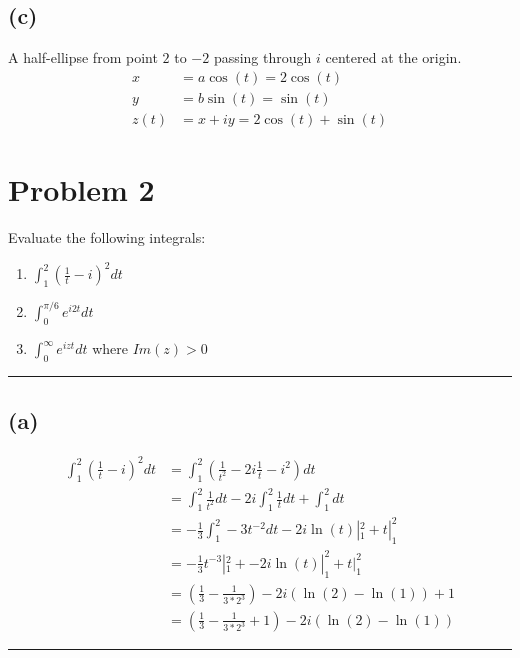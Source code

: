 \documentclass{article}
\let\oldcos\cos
\let\oldsin\sin
\renewcommand{\cos}[1]{\oldcos\left(#1\right)}
\renewcommand{\sin}[1]{\oldsin\left(#1\right)}
\begin{document}
\subsection*{(c)}
A half-ellipse from point $2$ to $-2$ passing through $i$ centered at the origin.
\begin{align*}
   x & = a \cos{t} = 2\cos{t}\\
  y & = b \sin{t} = \sin{t}\\
  z(t) &= x + iy = 2\cos{t} + \sin{t}
\end{align*}
\begin{center}
\end{center}


\newpage
\section*{Problem 2}
Evaluate the following integrals: 
\begin{enumerate}
\item  $\int_1^2 (\frac{1}{t}-i)^2 dt $
\item $\int_0^{\pi/6} e^{i2t}dt$
\item $\int_0^{\infty} e^{izt}dt$ where $Im(z)>0$ 
\end{enumerate}

\vspace{.5cm} %

\hrule
\subsection*{(a)}
\begin{align*}
  \int_1^2 (\frac{1}{t}-i)^2 dt &= \int_1^2 (\frac{1}{t^2} - 2i\frac{1}{t} -i^2) dt \\
  &= \int_1^2\frac{1}{t^2}dt -2i\int_1^2\frac{1}{t}dt + \int_1^2dt \\ 
  &= -\frac{1}{3}\int_1^2-3t^{-2}dt -2i\ln{(t)}|_1^2 + t|_1^2 \\ 
                                &=  -\frac{1}{3}t^{-3}|_1^2 + -2i\ln{(t)}|_1^2 + t|_1^2 \\
                                &= \left(\frac{1}{3}-\frac{1}{3*2^3}\right) - 2i(\ln{(2)}-\ln{(1)}) + 1 \\
                                &= \left(\frac{1}{3}-\frac{1}{3*2^3} + 1 \right) - 2i(\ln{(2)}-\ln{(1)}) 
\end{align*}
\hrule
\end{document}
